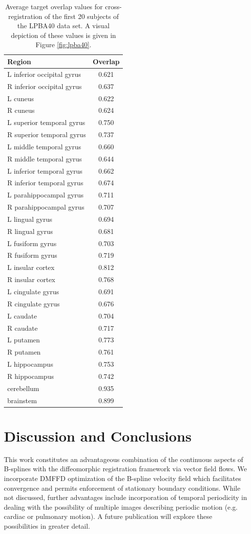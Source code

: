 \documentclass{llncs}
\begin{document}
\begin{table}[ht]
\begin{minipage}[b]{0.5\linewidth}
\begin{tabular}{lc}
{\bf Region} & {\bf Overlap} \\
\hline
L inferior occipital gyrus & 0.621 \\
R inferior occipital gyrus & 0.637 \\
L cuneus & 0.622 \\
R cuneus & 0.624 \\
L superior temporal gyrus & 0.750 \\
R superior temporal gyrus & 0.737 \\
L middle temporal gyrus & 0.660 \\
R middle temporal gyrus & 0.644 \\
L inferior temporal gyrus & 0.662 \\
R inferior temporal gyrus & 0.674 \\
L parahippocampal gyrus & 0.711 \\
R parahippocampal gyrus & 0.707 \\
L lingual gyrus & 0.694 \\
R lingual gyrus & 0.681 \\
L fusiform gyrus & 0.703 \\
R fusiform gyrus & 0.719 \\
L insular cortex & 0.812 \\
R insular cortex & 0.768 \\
L cingulate gyrus & 0.691 \\
R cingulate gyrus & 0.676 \\
L caudate & 0.704 \\
R caudate & 0.717 \\
L putamen & 0.773 \\
R putamen & 0.761 \\
L hippocampus & 0.753 \\
R hippocampus & 0.742 \\
cerebellum & 0.935 \\
brainstem & 0.899 \\
\hline
\end{tabular}
\end{minipage}
\vspace{1.0mm}
\caption{Average target overlap values for cross-registration of the first 
20 subjects of the LPBA40 data set.  A visual depiction of these values is
given in Figure \ref{fig:lpba40}.
}
\end{table}

\section{Discussion and Conclusions}
This work constitutes an advantageous combination of the continuous aspects of
B-splines with the diffeomorphic registration framework via vector field 
flows.  We incorporate
DMFFD optimization of the B-spline velocity field which facilitates 
convergence and permits enforcement of stationary boundary conditions.  
While not discussed, further advantages include incorporation of temporal 
periodicity in dealing with the possibility of multiple images describing
periodic motion (e.g. cardiac or pulmonary motion). A future publication 
will explore these possibilities in greater detail. 



\end{document}
